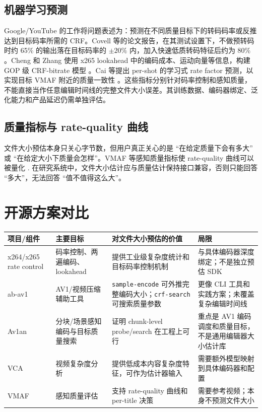 \documentclass[UTF8,a4paper,11pt]{ctexart}
\begin{document}
\subsection{机器学习预测}

Google/YouTube 的工作将问题表述为：预测在不同质量目标下的转码码率或反推达到目标码率所需的 CRF。Covell 等的论文报告，在其测试设置下，不做预转码时约 65\% 的输出落在目标码率的 $\pm20\%$ 内，加入快速低质转码特征后约为 80\% \cite{google_ml_transcoding}。Cheng 和 Zhang 使用 x265 lookahead 中的编码成本、运动向量等信息，构建 GOP 级 CRF-bitrate 模型 \cite{cheng2019x265}。Cai 等提出 per-shot 的学习式 rate factor 预测，以实现目标 VMAF 附近的质量一致性 \cite{cai2022per_shot}。这些指标分别针对码率控制和感知质量，不能直接当作任意编辑时间线的完整文件大小误差。其训练数据、编码器绑定、泛化能力和产品延迟仍需单独评估。

\subsection{质量指标与 rate-quality 曲线}

文件大小预估本身只关心字节数，但用户真正关心的是 ``在给定质量下会有多大'' 或 ``在给定大小下质量会怎样''。VMAF 等感知质量指标使 rate-quality 曲线可以被量化 \cite{vmaf}. 在研究系统中，文件大小估计应与质量估计保持接口兼容，否则只能回答 ``多大''，无法回答 ``值不值得这么大''。

\section{开源方案对比}

\begin{longtable}{p{3.1cm}p{3.2cm}p{4.1cm}p{4.1cm}}
\toprule
\textbf{项目/组件} & \textbf{主要目标} & \textbf{对文件大小预估的价值} & \textbf{局限} \\
\midrule
\endhead
x264/x265 rate control & 码率控制、两遍编码、lookahead & 提供工业级复杂度统计和目标码率控制机制 & 与具体编码器深度绑定；不是独立预估 SDK \\
ab-av1 & AV1/视频压缩辅助工具 & \texttt{sample-encode} 可外推完整编码大小；\texttt{crf-search} 可搜索质量参数 & 更像 CLI 工具和实践方案；未覆盖复杂编辑时间线 \\
Av1an & 分块/场景感知编码与目标质量搜索 & 证明 chunk-level probe/search 在工程上可行 & 重点是 AV1 编码调度和质量目标，不是通用编辑器大小估计库 \\
VCA & 视频复杂度分析 & 提供低成本内容复杂度特征，可作为估计器输入 & 需要额外模型映射到具体编码器和配置 \\
VMAF & 感知质量评估 & 支持 rate-quality 曲线和 per-title 决策 & 需要参考视频；本身不预测文件大小 \\
\bottomrule
\end{longtable}
\end{document}
